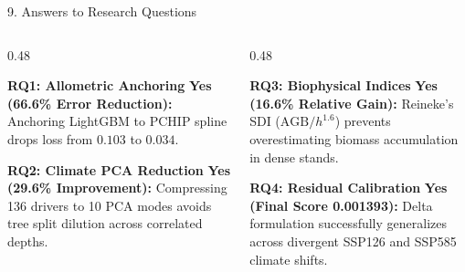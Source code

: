 \documentclass[aspectratio=169,10pt]{beamer}
\begin{document}
\begin{frame}{9. Answers to Research Questions}
\begin{columns}[T]
    \begin{column}{0.48\textwidth}
        \begin{block}{\textbf{RQ1: Allometric Anchoring}}
        \textbf{Yes (66.6\% Error Reduction):} Anchoring LightGBM to PCHIP spline drops loss from $0.103$ to $0.034$.
        \end{block}
        \begin{block}{\textbf{RQ2: Climate PCA Reduction}}
        \textbf{Yes (29.6\% Improvement):} Compressing 136 drivers to 10 PCA modes avoids tree split dilution across correlated depths.
        \end{block}
    \end{column}
    \begin{column}{0.48\textwidth}
        \begin{block}{\textbf{RQ3: Biophysical Indices}}
        \textbf{Yes (16.6\% Relative Gain):} Reineke's SDI ($\text{AGB}/h^{1.6}$) prevents overestimating biomass accumulation in dense stands.
        \end{block}
        \begin{block}{\textbf{RQ4: Residual Calibration}}
        \textbf{Yes (Final Score 0.001393):} Delta formulation successfully generalizes across divergent SSP126 and SSP585 climate shifts.
        \end{block}
    \end{column}
\end{columns}
\end{frame}
\end{document}
